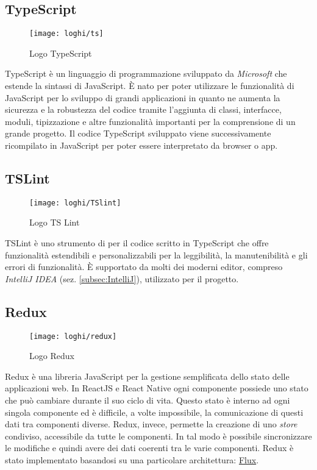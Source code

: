 \subsection{TypeScript} \label{subsec:tslint}
\begin{figure}[H] 
	\centering
	\texttt{[image: loghi/ts]}
	\caption{Logo TypeScript}
\end{figure}
TypeScript è un linguaggio di programmazione sviluppato da \emph{Microsoft} che 
estende la sintassi di JavaScript.  È nato per poter utilizzare le funzionalità di 
JavaScript per lo sviluppo di grandi applicazioni in quanto ne aumenta la 
sicurezza e la robustezza del codice tramite l'aggiunta di classi, interfacce, 
moduli, tipizzazione e altre funzionalità importanti per la comprensione di un 
grande progetto. 
Il codice TypeScript sviluppato viene successivamente ricompilato in JavaScript 
per poter essere interpretato da browser o app.

\subsection{TSLint}
\begin{figure}[H] 
	\centering
	\texttt{[image: loghi/TSlint]}
	\caption{Logo TS Lint}
\end{figure}
TSLint è uno strumento di  per il codice scritto in TypeScript 
che offre funzionalità estendibili e personalizzabili per la leggibilità, la 
manutenibilità e gli errori di funzionalità. 
È supportato da molti dei moderni editor, compreso \emph{IntelliJ IDEA} (sez. 
\ref{subsec:IntelliJ}), utilizzato per il progetto.

\subsection{Redux} \label{subsec:Redux}
\begin{figure}[H] 
	\centering
	\texttt{[image: loghi/redux]}
	\caption{Logo Redux}
\end{figure}
Redux è una libreria JavaScript per la gestione semplificata dello stato delle 
applicazioni web. In ReactJS e React Native ogni componente possiede uno stato 
che può cambiare durante il suo ciclo di vita. Questo stato è interno ad ogni 
singola componente ed è difficile, a volte impossibile, la comunicazione di questi 
dati tra componenti diverse. 
Redux, invece, permette la creazione di uno \emph{store} condiviso, accessibile da tutte 
le componenti. In tal modo è possibile sincronizzare le modifiche e quindi 
avere dei dati coerenti tra le varie componenti. 
Redux è stato implementato basandosi su una particolare architettura: 
\hyperref[subsec:flux]{Flux}.

